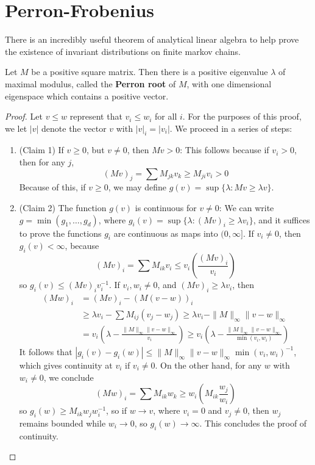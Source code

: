 \section{Perron-Frobenius}



There is an incredibly useful theorem of analytical linear algebra to help prove the existence of invariant distributions on finite markov chains.

\begin{theorem}
    Let $M$ be a positive square matrix. Then there is a positive eigenvalue $\lambda$ of maximal modulus, called the {\bf Perron root} of $M$, with one dimensional eigenspace which contains a positive vector.
\end{theorem}
\begin{proof}
    Let $v \leq w$ represent that $v_i \leq w_i$ for all $i$. For the purposes of this proof, we let $|v|$ denote the vector $v$ with $|v|_i = |v_i|$. We proceed in a series of steps:
    \begin{enumerate}
        \item[] (Claim 1) If $v \geq 0$, but $v \neq 0$, then $Mv > 0$: This follows because if $v_i > 0$, then for any $j$,
        \[ (Mv)_j = \sum M_{jk} v_k \geq M_{ji} v_i > 0 \]
        Because of this, if $v \geq 0$, we may define $g(v) = \sup \{ \lambda : Mv \geq \lambda v \}$.

        \item[] (Claim 2) The function $g(v)$ is continuous for $v \neq 0$: We can write $g = \min(g_1, \dots, g_d)$, where $g_i(v) = \sup \{ \lambda : (Mv)_i \geq \lambda v_i \}$, and it suffices to prove the functions $g_i$ are continuous as maps into $(0,\infty]$. If $v_i \neq 0$, then $g_i(v) < \infty$, because
        \[ (Mv)_i = \sum M_{ik} v_i \leq v_i \left(  \frac{(Mv)_i}{v_i} \right) \]
        so $g_i(v) \leq (Mv)_i v_i^{-1}$. If $v_i,w_i \neq 0$, and $(Mv)_i \geq \lambda v_i$, then
        \begin{align*}
            (Mw)_i &= (Mv)_i - (M(v-w))_i\\
            &\geq \lambda v_i - \sum M_{ij}(v_j - w_j) \geq \lambda v_i - \| M \|_\infty \| v - w \|_\infty\\
            &= v_i \left( \lambda - \frac{\| M \|_\infty \| v - w \|_\infty}{v_i} \right) \geq v_i \left( \lambda - \frac{\| M \|_\infty \| v - w \|_\infty}{\min(v_i,w_i)} \right)
        \end{align*}
        It follows that $|g_i(v) - g_i(w)| \leq \| M \|_\infty \| v - w \|_\infty \min(v_i,w_i)^{-1}$, which gives continuity at $v_i$ if $v_i \neq 0$. On the other hand, for any $w$ with $w_i \neq 0$, we conclude
        \[ (Mw)_i = \sum M_{ik}w_k \geq w_i \left(M_{ik} \frac{w_j}{w_i} \right) \]
        so $g_i(w) \geq M_{ik}w_jw_i^{-1}$, so if $w \to v$, where $v_i = 0$ and $v_j \neq 0$, then $w_j$ remains bounded while $w_i \to 0$, so $g_i(w) \to \infty$. This concludes the proof of continuity.


\end{enumerate}
\end{proof}
